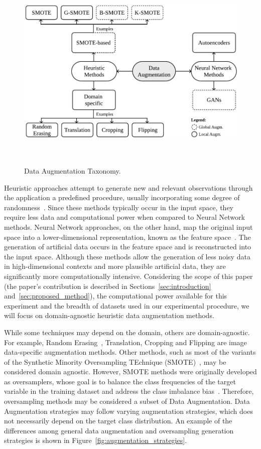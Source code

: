 \documentclass[parskip=full]{scrartcl}
\begin{document}
\begin{figure}[H]
	\centering
	\includegraphics[width=.8\linewidth]{../analysis/data_augmentation_taxonomy}
    \caption{%
        Data Augmentation Taxonomy.
    }~\label{fig:data_augmentation_taxonomy}
\end{figure}

Heuristic approaches attempt to generate new and relevant observations through
the application a predefined procedure, usually incorporating some degree of
randomness~\cite{Kashefi2020}. Since these methods typically occur in the
input space, they require less data and computational power when compared to
Neural Network methods. Neural Network approaches, on the other hand, map the
original input space into a lower-dimensional representation, known as the
feature space~\cite{DeVries2017}. The generation of artificial data occurs in
the feature space and is reconstructed into the input space. Although these
methods allow the generation of less noisy data in high-dimensional contexts
and more plausible artificial data, they are significantly more
computationally intensive. Considering the scope of this paper (the paper's
contribution is described in Sections~\ref{sec:introduction}
and~\ref{sec:proposed_method}), the computational power available for this
experiment and the breadth of datasets used in our experimental procedure, we
will focus on domain-agnostic heuristic data augmentation methods.

While some techniques may depend on the domain, others are domain-agnostic.
For example, Random Erasing~\cite{Zhong2020}, Translation, Cropping and
Flipping are image data-specific augmentation methods. Other methods, such as
most of the variants of the Synthetic Minority Oversampling TEchnique
(SMOTE)~\cite{Chawla2002}, may be considered domain agnostic. However, SMOTE
methods were originally developed as oversamplers, whose goal is to balance
the class frequencies of the target variable in the training dataset and
address the class imbalance bias~\cite{Fonseca2021ksmote}. Therefore,
oversampling methods may be considered a subset of Data Augmentation. Data
Augmentation strategies may follow varying augmentation strategies, which does
not necessarily depend on the target class distribution. An example of the
differences among general data augmentation and oversampling generation
strategies is shown in Figure~\ref{fig:augmentation_strategies}.
\end{document}
